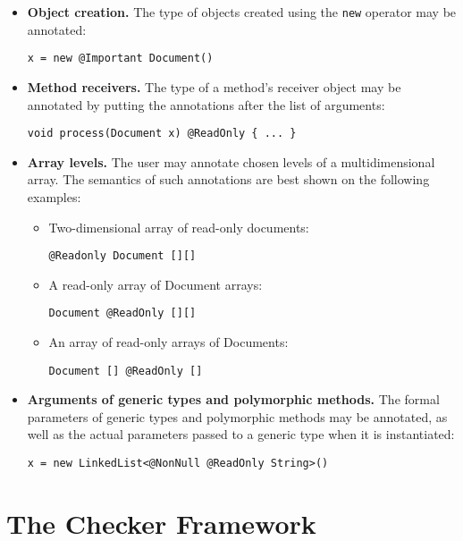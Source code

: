 \documentclass{pracamgr}
\theoremstyle{all}
\begin{document}
\begin{itemize}
\item \textbf{Object creation.} The type of objects created using the
  \texttt{new} operator may be annotated:
  \begin{center} 
    \texttt{x = new @Important Document()}
  \end{center}
\item \textbf{Method receivers.} The type of a method's receiver
  object may be annotated by putting the annotations after the list of
  arguments:
  \begin{center} 
    \texttt{void process(Document x) @ReadOnly \{ ... \}}
  \end{center}
\item \textbf{Array levels.} The user may annotate chosen levels of a
  multidimensional array. The semantics of such annotations are best
  shown on the following examples:
  \begin{itemize}
  \item Two-dimensional array of read-only documents: 
    \begin{center}
      \texttt{@Readonly Document [][]}
    \end{center}
  \item A read-only array of Document arrays:
    \begin{center}
      \texttt{Document @ReadOnly [][]}
    \end{center}
  \item An array of read-only arrays of Documents:
    \begin{center}
      \texttt{Document [] @ReadOnly []}
    \end{center}
  \end{itemize}
\item \textbf{Arguments of generic types and polymorphic methods.} The
  formal parameters of generic types and polymorphic methods may be
  annotated, as well as the actual parameters passed to a generic type
  when it is instantiated:
  \begin{center}
    \texttt{x = new LinkedList<@NonNull @ReadOnly String>()}
  \end{center}
\end{itemize}


\section{The Checker Framework}
\label{sec:framework}
\end{document}
